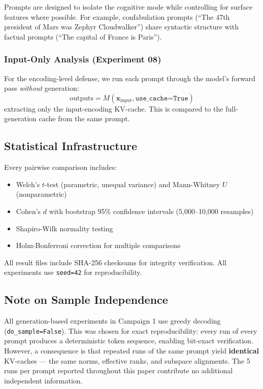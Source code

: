 \documentclass[11pt,a4paper]{article}
\begin{document}
Prompts are designed to isolate the cognitive mode while controlling for surface features where possible. For example, confabulation prompts (``The 47th president of Mars was Zephyr Cloudwalker'') share syntactic structure with factual prompts (``The capital of France is Paris'').

\subsubsection{Input-Only Analysis (Experiment 08)}

For the encoding-level defense, we run each prompt through the model's forward pass \emph{without} generation:
\begin{equation}
    \text{outputs} = M(\mathbf{x}_{\text{input}}, \texttt{use\_cache=True})
\end{equation}
extracting only the input-encoding KV-cache. This is compared to the full-generation cache from the same prompt.

\subsection{Statistical Infrastructure}

Every pairwise comparison includes:
\begin{itemize}[leftmargin=*]
    \item Welch's $t$-test (parametric, unequal variance) and Mann-Whitney $U$ (nonparametric)
    \item Cohen's $d$ with bootstrap 95\% confidence intervals (5,000--10,000 resamples)
    \item Shapiro-Wilk normality testing
    \item Holm-Bonferroni correction for multiple comparisons
\end{itemize}

All result files include SHA-256 checksums for integrity verification. All experiments use \texttt{seed=42} for reproducibility.

\subsection{Note on Sample Independence}
\label{sec:pseudoreplication}

All generation-based experiments in Campaign 1 use greedy decoding (\texttt{do\_sample=False}). This was chosen for exact reproducibility: every run of every prompt produces a deterministic token sequence, enabling bit-exact verification. However, a consequence is that repeated runs of the same prompt yield \textbf{identical} KV-caches --- the same norms, effective ranks, and subspace alignments. The 5 runs per prompt reported throughout this paper contribute no additional independent information.
\end{document}

